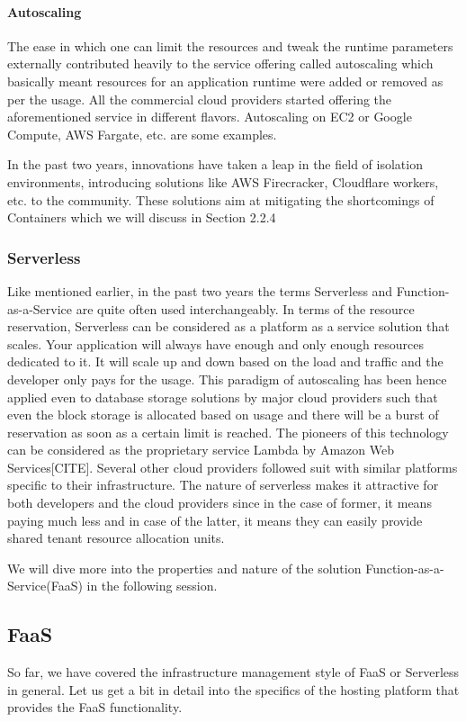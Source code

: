 \documentclass[12pt,titlepage]{article}
\begin{document}
\paragraph{Autoscaling}
\label{sec:org0b162ec}
The ease in which one can limit the resources and tweak the runtime parameters externally contributed heavily
to the service offering called autoscaling which basically meant resources for an
application runtime were added or removed as per the usage. All the commercial
cloud providers started offering the aforementioned service in different
flavors. Autoscaling on EC2 or Google Compute, AWS Fargate, etc. are some examples.

In the past two years, innovations have taken a leap in the field of isolation
environments, introducing solutions like AWS Firecracker, Cloudflare workers,
etc. to the community. These solutions aim at mitigating the shortcomings of
Containers which we will discuss in Section 2.2.4

\subsubsection{Serverless}
\label{sec:org6d82f11}
Like mentioned earlier, in the past two years the terms Serverless and Function-as-a-Service are quite
often used interchangeably. In terms of the resource reservation, Serverless can
be considered as a platform as a service solution that scales. Your application
will always have enough and only enough resources dedicated to it. It will scale
up and down based on the load and traffic and the developer only pays for the usage.
This paradigm of autoscaling has been hence applied even to database storage
solutions by major cloud providers such that even the block storage is allocated
based on usage and there will be a burst of reservation as soon as a certain
limit is reached.
The pioneers of this technology can be considered as the proprietary service
Lambda by Amazon Web Services[CITE]. Several other cloud providers followed suit
with similar platforms specific to their infrastructure.
The nature of serverless makes it attractive for both developers and the cloud
providers since in the case of former, it means paying much less and in case of
the latter, it means they can easily provide shared tenant resource allocation
units.

We will dive more into the properties and nature of the solution
Function-as-a-Service(FaaS) in the following session. 

\subsection{FaaS}
\label{sec:orgb02c343}
So far, we have covered the infrastructure management style of FaaS or
Serverless in general. Let us get a bit in detail into the specifics of the
hosting platform that provides the FaaS functionality.
\end{document}
